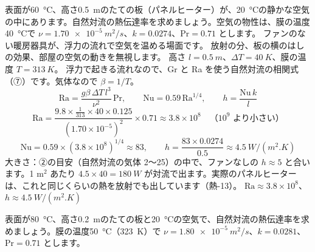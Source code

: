 \label{ph:熱-12:ex5}
\begin{phreidai}[暖房の板の自然対流]
表面が\qty{60}{\celsius}、高さ\qty{0.5}{m}のたての板（パネルヒーター）が、\qty{20}{\celsius}の静かな空気の中にあります。自然対流の熱伝達率を求めましょう。空気の物性は、膜の温度\qty{40}{\celsius}で $\nu=\qty{1.70e-5}{m^2/s}$、$k=0.0274$、$\mathrm{Pr}=0.71$ とします。
\phbamen
ファンのない暖房器具が、浮力の流れで空気を温める場面です。
\phmushi
放射の分、板の横のはしの効果、部屋の空気の動きを無視します。
\phzu
高さ $l=\qty{0.5}{m}$、$\Delta T=\qty{40}{K}$、膜の温度 $T=\qty{313}{K}$。
\phriyu
浮力で起きる流れなので、Gr と Ra を使う自然対流の相関式（⑦）です。気体なので $\beta=1/T$。
\phtateru
\[\mathrm{Ra}=\frac{g\beta\,\Delta T\,l^3}{\nu^2}\,\mathrm{Pr},\qquad\mathrm{Nu}=0.59\,\mathrm{Ra}^{1/4},\qquad h=\frac{\mathrm{Nu}\,k}{l}\]
\phtoku
\[\mathrm{Ra}=\frac{9.8\times\frac{1}{313}\times40\times0.125}{(1.70\times10^{-5})^2}\times0.71\approx3.8\times10^8\quad\text{（$10^9$ より小さい）}\]
\[\mathrm{Nu}=0.59\times(3.8\times10^8)^{1/4}\approx83,\qquad h=\frac{83\times0.0274}{0.5}\approx\qty{4.5}{W/(m^2.K)}\]
\phtashikame
大きさ：②の目安（自然対流の気体 2〜25）の中で、ファンなしの $h\approx5$ と合います。1 m$^2$ あたり $4.5\times40=\qty{180}{W}$ が対流で出ます。実際のパネルヒーターは、これと同じくらいの熱を放射でも出しています（熱-13）。
\kotae $\mathrm{Ra}\approx3.8\times10^8$、$h\approx\qty{4.5}{W/(m^2.K)}$
\end{phreidai}
\begin{jibun}
表面が\qty{80}{\celsius}、高さ\qty{0.2}{m}のたての板と\qty{20}{\celsius}の空気で、自然対流の熱伝達率を求めましょう。膜の温度\qty{50}{\celsius}（\qty{323}{K}）で $\nu=\qty{1.80e-5}{m^2/s}$、$k=0.0281$、$\mathrm{Pr}=0.71$ とします。
\end{jibun}

